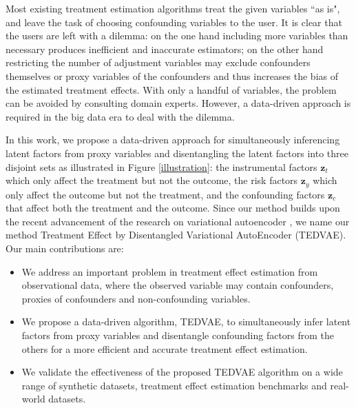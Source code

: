 \documentclass[letterpaper]{article} %
\begin{document}

Most existing treatment estimation algorithms treat the given variables ``as is", and leave the task of choosing confounding variables to the user.
It is clear that the users are left with a dilemma: on the one hand including more variables than necessary produces inefficient and inaccurate estimators; on the other hand restricting the number of adjustment variables may exclude confounders themselves or proxy variables of the confounders and thus increases the bias of the estimated treatment effects.
With only a handful of variables, the problem can be avoided by consulting domain experts.
However, a data-driven approach is required in the big data era to deal with the dilemma.

In this work, we propose a data-driven approach for simultaneously inferencing latent factors from proxy variables and disentangling the latent factors into three disjoint sets as illustrated in Figure \ref{illustration}: the instrumental factors $\mathbf{z}_t$ which only affect the treatment but not the outcome, the risk factors $\mathbf{z}_y$ which only affect the outcome but not the treatment, and the confounding factors $\mathbf{z}_c$ that affect both the treatment and the outcome.
Since our method builds upon the recent advancement of the research on variational autoencoder \cite{Kingma2014}, we name our method Treatment Effect by Disentangled Variational AutoEncoder (TEDVAE).
Our main contributions are:
\begin{itemize}
	\item We address an important problem in treatment effect estimation from observational data, where the observed variable may contain confounders, proxies of confounders and non-confounding variables.
	\item We propose a data-driven algorithm, TEDVAE, to simultaneously infer latent factors from proxy variables and disentangle confounding factors from the others for a more efficient and accurate treatment effect estimation.
	\item We validate the effectiveness of the proposed TEDVAE algorithm on a wide range of synthetic datasets, treatment effect estimation benchmarks and real-world datasets.
\end{itemize}
\end{document}
